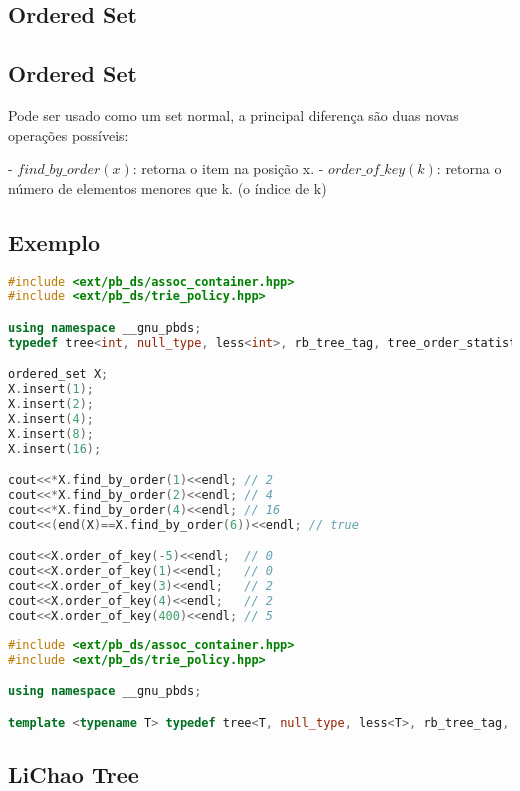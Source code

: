 \documentclass[11pt, a4paper, twoside]{article}
\begin{document}
\subsection{Ordered Set}

\subsection{Ordered Set}



Pode ser usado como um set normal, a principal diferença são duas novas operações possíveis:

- $find\_by\_order(x)$: retorna o item na posição x.
- $order\_of\_key(k)$: retorna o número de elementos menores que k. (o índice de k)

\subsection{Exemplo}

\begin{lstlisting}[language=C++]
#include <ext/pb_ds/assoc_container.hpp>
#include <ext/pb_ds/trie_policy.hpp>

using namespace __gnu_pbds;
typedef tree<int, null_type, less<int>, rb_tree_tag, tree_order_statistics_node_update> ordered_set;

ordered_set X;
X.insert(1);
X.insert(2);
X.insert(4);
X.insert(8);
X.insert(16);

cout<<*X.find_by_order(1)<<endl; // 2
cout<<*X.find_by_order(2)<<endl; // 4
cout<<*X.find_by_order(4)<<endl; // 16
cout<<(end(X)==X.find_by_order(6))<<endl; // true

cout<<X.order_of_key(-5)<<endl;  // 0
cout<<X.order_of_key(1)<<endl;   // 0
cout<<X.order_of_key(3)<<endl;   // 2
cout<<X.order_of_key(4)<<endl;   // 2
cout<<X.order_of_key(400)<<endl; // 5

\end{lstlisting}


\begin{lstlisting}[language=C++]
#include <ext/pb_ds/assoc_container.hpp>
#include <ext/pb_ds/trie_policy.hpp>

using namespace __gnu_pbds;

template <typename T> typedef tree<T, null_type, less<T>, rb_tree_tag, tree_order_statistics_node_update> ordered_set;\end{lstlisting}

\subsection{LiChao Tree}
\end{document}
